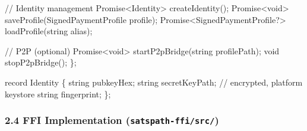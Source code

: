 \documentclass[
]{article}
\newenvironment{Shaded}{}{}
\newcommand{\NormalTok}[1]{#1}
\begin{document}
\begin{Shaded}
\begin{Highlighting}[]
\NormalTok{    // Identity management}
\NormalTok{    Promise\textless{}Identity\textgreater{} createIdentity();}
\NormalTok{    Promise\textless{}void\textgreater{} saveProfile(SignedPaymentProfile profile);}
\NormalTok{    Promise\textless{}SignedPaymentProfile?\textgreater{} loadProfile(string alias);}

\NormalTok{    // P2P (optional)}
\NormalTok{    Promise\textless{}void\textgreater{} startP2pBridge(string profilePath);}
\NormalTok{    void stopP2pBridge();}
\NormalTok{\};}

\NormalTok{record Identity \{}
\NormalTok{    string pubkeyHex;}
\NormalTok{    string secretKeyPath;  // encrypted, platform keystore}
\NormalTok{    string fingerprint;}
\NormalTok{\};}
\end{Highlighting}
\end{Shaded}

\hypertarget{ffi-implementation-satspath-ffisrc}{%
\subsubsection{\texorpdfstring{2.4 FFI Implementation
(\texttt{satspath-ffi/src/})}{2.4 FFI Implementation (satspath-ffi/src/)}}\label{ffi-implementation-satspath-ffisrc}}
\end{document}
